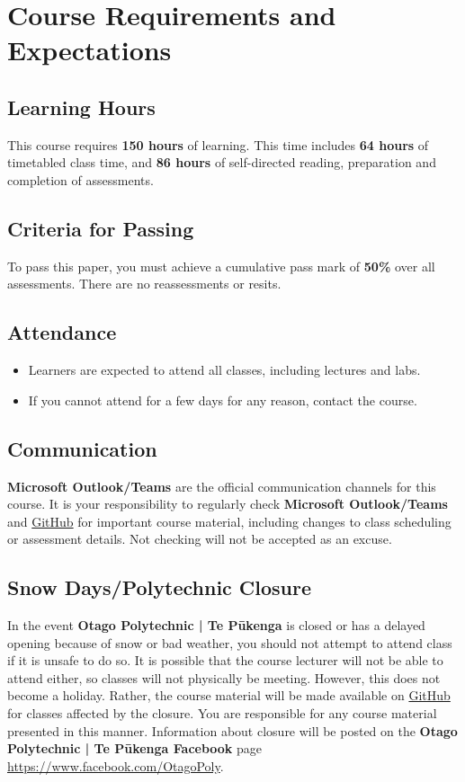 \documentclass{article}
\begin{document}
\section*{Course Requirements and Expectations}

\subsection*{Learning Hours}
This course requires \textbf{150 hours} of learning. This time includes \textbf{64 hours} of timetabled class time, and \textbf{86 hours} of self-directed reading, preparation and completion of assessments.  

\subsection*{Criteria for Passing}
To pass this paper, you must achieve a cumulative pass mark of \textbf{50\%} over all assessments. There are no reassessments or resits.

\subsection*{Attendance}
\begin{itemize}
	\item Learners are expected to attend all classes, including lectures and labs.
	\item If you cannot attend for a few days for any reason, contact the course.
\end{itemize}

\subsection*{Communication}
\textbf{Microsoft Outlook/Teams} are the official communication channels for this course. It is your responsibility to regularly check \textbf{Microsoft Outlook/Teams} and \href{https://github.com/otago-polytechnic-bit-courses/ID721001-mobile-application-development}{GitHub} for important course material, including changes to class scheduling or assessment details. Not checking will not be accepted as an excuse.

\subsection*{Snow Days/Polytechnic Closure}
In the event \textbf{Otago Polytechnic | Te Pūkenga} is closed or has a delayed opening because of snow or bad weather, you should not attempt to attend class if it is unsafe to do so. It is possible that the course lecturer will not be able to attend either, so classes will not physically be meeting. However, this does not become a holiday. Rather, the course material will be made available on \href{https://github.com/otago-polytechnic-bit-courses/ID721001-mobile-application-development}{GitHub} for classes affected by the closure. You are responsible for any course material presented in this manner. Information about closure will be posted on the \textbf{Otago Polytechnic | Te Pūkenga Facebook} page \href{https://www.facebook.com/OtagoPoly}{https://www.facebook.com/OtagoPoly}.
\end{document}
